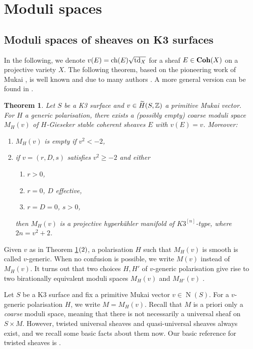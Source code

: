 \documentclass[11pt,twoside]{amsart}
\numberwithin{equation}{section}
\newtheorem{theorem}[dummy]{Theorem}
\theoremstyle{definition}
\theoremstyle{plain}
\def\N{\operatorname{N}}
\begin{document}
\section{Moduli spaces}
\subsection{Moduli spaces of sheaves on K3 surfaces}
In the following, we denote $v(E)=\operatorname{ch}(E)\sqrt{\operatorname{td}_X}$ for a sheaf $E\in\operatorname{\mathbf{Coh}}(X)$ on a projective variety $X$. The following theorem, based on the pioneering work of Mukai \cite{Muk87}, is well known and due to many authors \cite{GH96,Huy06,OGr97}. A more general version can be found in \cite{BM14i, BM14ii}.

\begin{theorem}\label{thm: moduli sheaves K3}
    Let $S$ be a K3 surface and $v\in \widetilde{H}(S,\mathbb{Z})$ a primitive Mukai vector. For $H$ a generic polarisation, there exists a (possibly empty) coarse moduli space $M_{H}(v)$ of $H$-Gieseker stable coherent sheaves $E$ with $v(E)=v$. Moreover:
    \begin{enumerate}
        \item $M_H(v)$ is empty if $v^2<-2$,
        \item if $v=(r,D,s)$ satisfies $v^2\geq -2$ and either
        \begin{enumerate}
            \item $r>0$,
            \item $r=0$, $D$ effective,
            \item $r=D=0$, $s>0$,
        \end{enumerate}
        then $M_H(v)$ is a projective hyperk\"ahler manifold of $K3^{[n]}$-type, where $2n= v^2+2$.
    \end{enumerate}
\end{theorem}

Given $v$ as in Theorem \ref{thm: moduli sheaves K3}${\rm (2)}$, a polarisation $H$ such that $M_H(v)$ is smooth is called $v$-generic. When no confusion is possible, we write $M(v)$ instead of $M_H(v)$. It turns out that two choices $H,H'$ of $v$-generic polarisation give rise to two birationally equivalent moduli spaces $M_H(v)$ and $M_{H'}(v)$ \cite[Theorem 1.1]{BM14ii}. 


Let $S$ be a K3 surface and fix a primitive Mukai vector $v\in \N(S)$. For a $v$-generic polarisation $H$, we write $M = M_H(v)$. Recall that $M$ is a priori only a \textit{coarse} moduli space, meaning that there is not necessarily a universal sheaf on $S\times M$. However, twisted universal sheaves and quasi-universal sheaves always exist, and we recall some basic facts about them now. Our basic reference for twisted sheaves is \cite{Cal00}.
\end{document}
